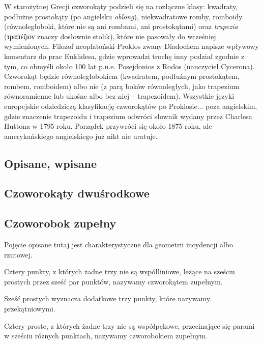 W starożytnej Grecji czworokąty podzieli się na rozłączne klasy: kwadraty, podłużne prostokąty (po angielsku \emph{oblong}), niekwadratowe romby, romboidy (równoległoboki, które nie są ani rombami, ani prostokątami) oraz \emph{trapezia} (τραπέζιον znaczy dosłownie stolik), które nie pasowały do wcześniej wymienionych.
Filozof neoplatoński Proklos zwany Diadochem napisze wpływowy komentarz do prac Euklidesa, gdzie wprowadzi trochę inny podział zgodnie z tym, co obmyśli około 100 lat p.n.e. Posejdonios z Rodos (nauczyciel Cycerona).
Czworokąt będzie równoległobokiem (kwadratem, podłużnym prostokątem, rombem, romboidem) albo nie (z parą boków równoległych, jako trapezium równoramienne lub ukośne albo bez niej -- trapezoidem).
Wszystkie języki europejskie odziedziczą klasyfikację czworokątów po Proklosie... poza angielskim, gdzie znaczenie trapezoidu i trapezium odwróci słownik wydany przez Charlesa Huttona w 1795 roku.
Porządek przywróci się około 1875 roku, ale amerykańskiego angielskiego już nikt nie uratuje.

\subsection{Opisane, wpisane}



\subsection{Czoworokąty dwuśrodkowe}


\subsection{Czoworobok zupełny}
Pojęcie opisane tutaj jest charakterystyczne dla geometrii incydencji albo rzutowej.

\begin{definition}
	Cztery punkty, z których żadne trzy nie są współliniowe, leżące na sześciu prostych przez sześć par punktów, nazywamy czworokątem zupełnym.
\end{definition}

Sześć prostych wyznacza dodatkowe trzy punkty, które nazywamy przekątniowymi.

\begin{definition}
	Cztery proste, z których żadne trzy nie są współpękowe, przecinające się parami w sześciu różnych punktach, nazywamy czworobokiem zupełnym.
\end{definition}

